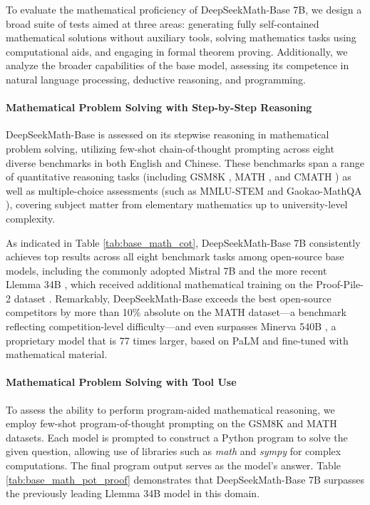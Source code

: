 To evaluate the mathematical proficiency of DeepSeekMath-Base 7B, we design a broad suite of tests aimed at three areas: generating fully self-contained mathematical solutions without auxiliary tools, solving mathematics tasks using computational aids, and engaging in formal theorem proving. Additionally, we analyze the broader capabilities of the base model, assessing its competence in natural language processing, deductive reasoning, and programming.

\paragraph{Mathematical Problem Solving with Step-by-Step Reasoning}

DeepSeekMath-Base is assessed on its stepwise reasoning in mathematical problem solving, utilizing few-shot chain-of-thought prompting \citep{cot} across eight diverse benchmarks in both English and Chinese. These benchmarks span a range of quantitative reasoning tasks (including GSM8K \citep{gsm8k}, MATH \citep{MATH}, and CMATH \citep{wei2023cmath}) as well as multiple-choice assessments (such as MMLU-STEM \citep{mmlu} and Gaokao-MathQA \citep{agieval}), covering subject matter from elementary mathematics up to university-level complexity.

As indicated in Table \ref{tab:base_math_cot}, DeepSeekMath-Base 7B consistently achieves top results across all eight benchmark tasks among open-source base models, including the commonly adopted Mistral 7B \citep{mistral} and the more recent Llemma 34B \citep{llemma}, which received additional mathematical training on the Proof-Pile-2 dataset \citep{llemma}. Remarkably, DeepSeekMath-Base exceeds the best open-source competitors by more than 10\% absolute on the MATH dataset—a benchmark reflecting competition-level difficulty—and even surpasses Minerva 540B \citep{minerva}, a proprietary model that is 77 times larger, based on PaLM \citep{palm} and fine-tuned with mathematical material.

\paragraph{Mathematical Problem Solving with Tool Use} 

To assess the ability to perform program-aided mathematical reasoning, we employ few-shot program-of-thought prompting \citep{pot,pal} on the GSM8K and MATH datasets. Each model is prompted to construct a Python program to solve the given question, allowing use of libraries such as \textit{math} and \textit{sympy} for complex computations. The final program output serves as the model's answer. Table \ref{tab:base_math_pot_proof} demonstrates that DeepSeekMath-Base 7B surpasses the previously leading Llemma 34B model in this domain.


